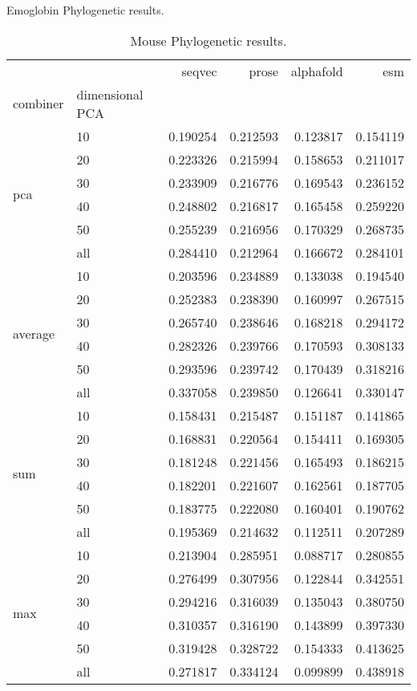 \documentclass[12pt, letterpaper, twocolumn]{article}
\begin{document}
\begin{table*}[hbt]
\caption{Emoglobin Phylogenetic results.}
\label{tab:emoglobin_phylo_results}
\end{table*}


\begin{table*}[hbt]
    \begin{tabular}{llrrrr}
        \toprule
         &  & seqvec & prose & alphafold & esm \\
        combiner & dimensional PCA &  &  &  &  \\
        \midrule
        \multirow[t]{6}{*}{pca} & 10 & 0.190254 & 0.212593 & 0.123817 & 0.154119 \\
         & 20 & 0.223326 & 0.215994 & 0.158653 & 0.211017 \\
         & 30 & 0.233909 & 0.216776 & 0.169543 & 0.236152 \\
         & 40 & 0.248802 & 0.216817 & 0.165458 & 0.259220 \\
         & 50 & 0.255239 & 0.216956 & 0.170329 & 0.268735 \\
         & all & 0.284410 & 0.212964 & 0.166672 & 0.284101 \\
        \cline{1-6}
        \multirow[t]{6}{*}{average} & 10 & 0.203596 & 0.234889 & 0.133038 & 0.194540 \\
         & 20 & 0.252383 & 0.238390 & 0.160997 & 0.267515 \\
         & 30 & 0.265740 & 0.238646 & 0.168218 & 0.294172 \\
         & 40 & 0.282326 & 0.239766 & 0.170593 & 0.308133 \\
         & 50 & 0.293596 & 0.239742 & 0.170439 & 0.318216 \\
         & all & 0.337058 & 0.239850 & 0.126641 & 0.330147 \\
        \cline{1-6}
        \multirow[t]{6}{*}{sum} & 10 & 0.158431 & 0.215487 & 0.151187 & 0.141865 \\
         & 20 & 0.168831 & 0.220564 & 0.154411 & 0.169305 \\
         & 30 & 0.181248 & 0.221456 & 0.165493 & 0.186215 \\
         & 40 & 0.182201 & 0.221607 & 0.162561 & 0.187705 \\
         & 50 & 0.183775 & 0.222080 & 0.160401 & 0.190762 \\
         & all & 0.195369 & 0.214632 & 0.112511 & 0.207289 \\
        \cline{1-6}
        \multirow[t]{6}{*}{max} & 10 & 0.213904 & 0.285951 & 0.088717 & 0.280855 \\
         & 20 & 0.276499 & 0.307956 & 0.122844 & 0.342551 \\
         & 30 & 0.294216 & 0.316039 & 0.135043 & 0.380750 \\
         & 40 & 0.310357 & 0.316190 & 0.143899 & 0.397330 \\
         & 50 & 0.319428 & 0.328722 & 0.154333 & 0.413625 \\
         & all & 0.271817 & 0.334124 & 0.099899 & 0.438918 \\
        \cline{1-6}
        \bottomrule
        \end{tabular}       
\caption{Mouse Phylogenetic results.}
\label{tab:mouse_phylo_results}
\end{table*}
\end{document}
